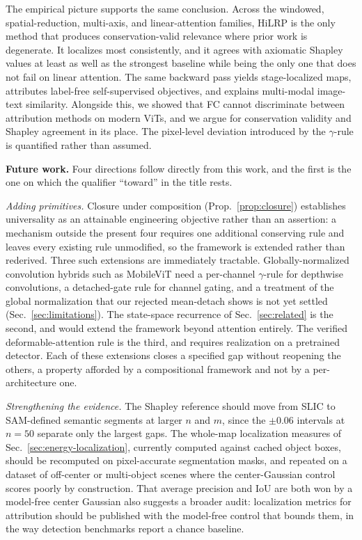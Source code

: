 \documentclass[lettersize,journal]{IEEEtran}
\theoremstyle{definition}
\theoremstyle{plain}
\begin{document}
The empirical picture supports the same conclusion. Across the windowed, spatial-reduction, multi-axis, and linear-attention families, HiLRP is the only method that produces conservation-valid relevance where prior work is degenerate. It localizes most consistently, and it agrees with axiomatic Shapley values at least as well as the strongest baseline while being the only one that does not fail on linear attention. The same backward pass yields stage-localized maps, attributes label-free self-supervised objectives, and explains multi-modal image-text similarity. Alongside this, we showed that FC cannot discriminate between attribution methods on modern ViTs, and we argue for conservation validity and Shapley agreement in its place. The pixel-level deviation introduced by the $\gamma$-rule is quantified rather than assumed.

\textbf{Future work.} Four directions follow directly from this work, and the
first is the one on which the qualifier ``toward'' in the title rests.

\emph{Adding primitives.} Closure under composition (Prop.~\ref{prop:closure}) establishes
universality as an attainable engineering objective rather than an assertion: a mechanism outside
the present four requires one additional conserving rule and leaves every existing rule unmodified,
so the framework is extended rather than rederived. Three such extensions are immediately
tractable. Globally-normalized convolution
hybrids such as MobileViT need a per-channel $\gamma$-rule for depthwise convolutions, a
detached-gate rule for channel gating, and a treatment of the global normalization that our
rejected mean-detach shows is not yet settled (Sec.~\ref{sec:limitations}). The state-space
recurrence of Sec.~\ref{sec:related} is the second, and would extend the framework beyond attention
entirely. The verified deformable-attention rule is the third, and requires realization on a
pretrained detector. Each of these
extensions closes a specified gap without reopening the others, a property afforded by a
compositional framework and not by a per-architecture one.

\emph{Strengthening the evidence.} The Shapley reference should move from SLIC to SAM-defined semantic segments at larger $n$ and $m$, since the $\pm0.06$ intervals at $n{=}50$ separate only the largest gaps. The whole-map localization measures of Sec.~\ref{sec:energy-localization}, currently computed against cached object boxes, should be recomputed on pixel-accurate segmentation masks, and repeated on a dataset of off-center or multi-object scenes where the center-Gaussian control scores poorly by construction. That average precision and IoU are both won by a model-free center Gaussian also suggests a broader audit: localization metrics for attribution should be published with the model-free control that bounds them, in the way detection benchmarks report a chance baseline.
\end{document}
